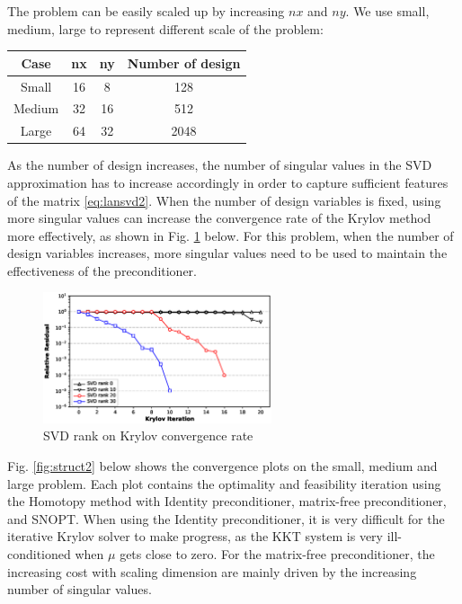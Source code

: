 \documentclass{article}
\theoremstyle{definition}
\begin{document}
The problem can be easily scaled up by increasing $nx$ and $ny$. We use small, medium, large to represent different scale of the problem:
\begin{center}
\begin{tabular}{ c c c c }
Case & nx  & ny & Number of design \\
\hline
 Small &   16 & 8 & 128 \\ 
 Medium &  32 & 16 & 512 \\  
 Large & 64 & 32 & 2048   
\end{tabular}
\end{center}

As the number of design increases, the number of singular values in the SVD approximation has to increase accordingly in order to capture sufficient features of the matrix \eqref{eq:lansvd2}. When the number of design variables is fixed, using more singular values can increase the convergence rate of the Krylov method more effectively, as shown in Fig. \ref{fig:svdrank} below. For this problem, when the number of design variables increases, more singular values need to be used to maintain the effectiveness of the preconditioner.   
\begin{figure}[H]
  \centering
  \includegraphics[width=0.6\textwidth]{./figs/svd_rank.eps}
  \caption{SVD rank on Krylov convergence rate}
  \label{fig:svdrank}
\end{figure}

Fig. \ref{fig:struct2} below shows the convergence plots on the small, medium and large problem. Each plot contains the optimality and feasibility iteration using the Homotopy method with Identity preconditioner, matrix-free preconditioner, and SNOPT.  When using the Identity preconditioner, it is very difficult for the iterative Krylov solver to make progress, as the KKT system is very ill-conditioned when $\mu$ gets close to zero. For the matrix-free preconditioner, the increasing cost with scaling dimension are mainly driven by the increasing number of singular values. 
\end{document}
